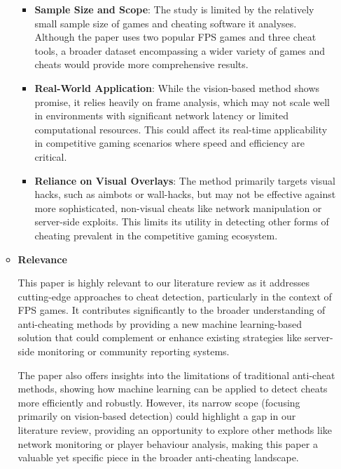\documentclass[a4paper, 12pt]{article}
\begin{document}
\begin{itemize}
\begin{itemize}
        \begin{itemize}
            \item \textbf{Sample Size and Scope}: The study is limited by the relatively small sample size of games and cheating software it analyses. Although the paper uses two popular FPS games and three cheat tools, a broader dataset encompassing a wider variety of games and cheats would provide more comprehensive results. 
            \item \textbf{Real-World Application}: While the vision-based method shows promise, it relies heavily on frame analysis, which may not scale well in environments with significant network latency or limited computational resources. This could affect its real-time applicability in competitive gaming scenarios where speed and efficiency are critical.
            \item \textbf{Reliance on Visual Overlays}: The method primarily targets visual hacks, such as aimbots or wall-hacks, but may not be effective against more sophisticated, non-visual cheats like network manipulation or server-side exploits. This limits its utility in detecting other forms of cheating prevalent in the competitive gaming ecosystem.
        \end{itemize}
        
        \item \textbf{Relevance}
        
        This paper is highly relevant to our literature review as it addresses cutting-edge approaches to cheat detection, particularly in the context of FPS games. It contributes significantly to the broader understanding of anti-cheating methods by providing a new machine learning-based solution that could complement or enhance existing strategies like server-side monitoring or community reporting systems.

        The paper also offers insights into the limitations of traditional anti-cheat methods, showing how machine learning can be applied to detect cheats more efficiently and robustly. However, its narrow scope (focusing primarily on vision-based detection) could highlight a gap in our literature review, providing an opportunity to explore other methods like network monitoring or player behaviour analysis, making this paper a valuable yet specific piece in the broader anti-cheating landscape.
        

\end{itemize}
\end{itemize}
\end{document}
